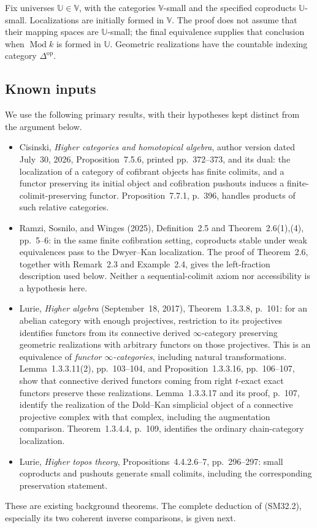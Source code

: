 \documentclass[11pt,a4paper]{article}
\theoremstyle{definition}\newtheorem{definition}[theorem]{Definition}
\theoremstyle{remark}\newtheorem{remark}[theorem]{Remark}
\begin{document}
Fix universes \(\mathbb U\in\mathbb V\), with the categories
\(\mathbb V\)-small and the specified coproducts
\(\mathbb U\)-small.  Localizations are initially formed in
\(\mathbb V\).  The proof does not assume that their mapping
spaces are \(\mathbb U\)-small; the final equivalence supplies
that conclusion when \(\operatorname{Mod}k\) is formed in
\(\mathbb U\).  Geometric realizations have the countable
indexing category \(\Delta^{\mathrm{op}}\).

\subsection{Known inputs}
We use the following primary results, with their hypotheses
kept distinct from the argument below.
\begin{itemize}
\item Cisinski, \emph{Higher categories and homotopical algebra},
author version dated July~30, 2026, Proposition~7.5.6,
printed pp.~372--373, and its dual: the localization of a
category of cofibrant objects has finite colimits, and a
functor preserving its initial object and cofibration pushouts
induces a finite-colimit-preserving functor.  Proposition~7.7.1,
p.~396, handles products of such relative categories.
\item Ramzi, Sosnilo, and Winges (2025), Definition~2.5 and
Theorem~2.6(1),(4), pp.~5--6: in the same finite cofibration
setting, coproducts stable under weak equivalences pass to the
Dwyer--Kan localization.  The proof of Theorem~2.6, together
with Remark~2.3 and Example~2.4, gives the left-fraction
description used below.  Neither a sequential-colimit axiom
nor accessibility is a hypothesis here.
\item Lurie, \emph{Higher algebra} (September~18, 2017),
Theorem~1.3.3.8, p.~101: for an abelian category with enough
projectives, restriction to its projectives identifies functors
from its connective derived \(\infty\)-category preserving
geometric realizations with arbitrary functors on those
projectives.  This is an equivalence of \emph{functor
\(\infty\)-categories}, including natural transformations.
Lemma~1.3.3.11(2), pp.~103--104, and Proposition~1.3.3.16,
pp.~106--107, show that connective derived functors coming
from right \(t\)-exact exact functors preserve these
realizations.  Lemma~1.3.3.17 and its proof, p.~107, identify
the realization of the Dold--Kan simplicial object of a
connective projective complex with that complex, including
the augmentation comparison.  Theorem~1.3.4.4, p.~109,
identifies the ordinary chain-category localization.
\item Lurie, \emph{Higher topos theory},
Propositions~4.4.2.6--7, pp.~296--297: small coproducts and
pushouts generate small colimits, including the corresponding
preservation statement.
\end{itemize}
These are existing background theorems.  The complete deduction
of (SM32.2), especially its two coherent inverse comparisons,
is given next.
\end{document}
